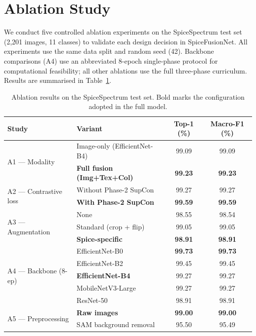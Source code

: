 \documentclass[conference]{IEEEtran}
\begin{document}
\section{Ablation Study}
\label{sec:ablation}

We conduct five controlled ablation experiments on the SpiceSpectrum test
set (2{,}201 images, 11 classes) to validate each design decision in
SpiceFusionNet. All experiments use the same data split and random seed (42).
Backbone comparisons (A4) use an abbreviated 8-epoch single-phase protocol
for computational feasibility; all other ablations use the full three-phase
curriculum. Results are summarised in Table~\ref{tab:ablation}.

\begin{table}[t]
\centering
\caption{Ablation results on the SpiceSpectrum test set.
         Bold marks the configuration adopted in the full model.}
\label{tab:ablation}
\setlength{\tabcolsep}{6pt}
\begin{tabular}{llcc}
\toprule
Study & Variant & Top-1 (\%) & Macro-F1 (\%) \\
\midrule
\multirow{2}{*}{A1 — Modality}
  & Image-only (EfficientNet-B4)        & 99.09 & 99.09 \\
  & \textbf{Full fusion (Img+Tex+Col)}  & \textbf{99.23} & \textbf{99.23} \\
\midrule
\multirow{2}{*}{A2 — Contrastive loss}
  & Without Phase-2 SupCon              & 99.27 & 99.27 \\
  & \textbf{With Phase-2 SupCon}        & \textbf{99.59} & \textbf{99.59} \\
\midrule
\multirow{3}{*}{A3 — Augmentation}
  & None                                & 98.55 & 98.54 \\
  & Standard (crop + flip)              & 99.05 & 99.05 \\
  & \textbf{Spice-specific}             & \textbf{98.91} & \textbf{98.91} \\
\midrule
\multirow{5}{*}{A4 — Backbone (8-ep)}
  & EfficientNet-B0                     & \textbf{99.73} & \textbf{99.73} \\
  & EfficientNet-B2                     & 99.45 & 99.45 \\
  & \textbf{EfficientNet-B4}            & 99.27 & 99.27 \\
  & MobileNetV3-Large                   & 99.27 & 99.27 \\
  & ResNet-50                           & 98.91 & 98.91 \\
\midrule
\multirow{2}{*}{A5 — Preprocessing}
  & \textbf{Raw images}                 & \textbf{99.00} & \textbf{99.00} \\
  & SAM background removal              & 95.50 & 95.49 \\
\bottomrule
\end{tabular}
\end{table}
\end{document}
